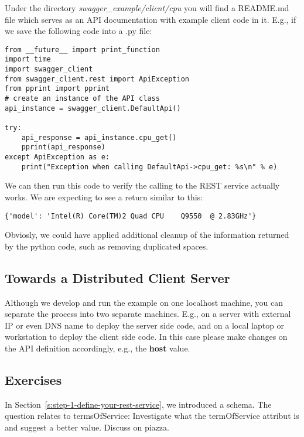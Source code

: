 Under the directory \emph{swagger\_example/client/cpu} you will find a
README.md file which serves as an API documentation with example client
code in it. E.g., if we save the following code into a .py file:

\begin{lstlisting}
from __future__ import print_function
import time
import swagger_client
from swagger_client.rest import ApiException
from pprint import pprint
# create an instance of the API class
api_instance = swagger_client.DefaultApi()

try:
    api_response = api_instance.cpu_get()
    pprint(api_response)
except ApiException as e:
    print("Exception when calling DefaultApi->cpu_get: %s\n" % e)
\end{lstlisting}

We can then run this code to verify the calling to the REST service
actually works. We are expecting to see a return similar to this:

\begin{lstlisting}
{'model': 'Intel(R) Core(TM)2 Quad CPU    Q9550  @ 2.83GHz'}
\end{lstlisting}

Obviosly, we could have applied additional cleanup of the information
returned by the python code, such as removing duplicated spaces.

\subsection{Towards a Distributed Client
Server}\label{towards-a-distributed-client-server}

Although we develop and run the example on one localhost machine, you
can separate the process into two separate machines. E.g., on a server
with external IP or even DNS name to deploy the server side code, and on
a local laptop or workstation to deploy the client side code. In this
case please make changes on the API definition accordingly, e.g., the
\textbf{host} value.

\subsection{Exercises}\label{s:swagger-exercises}

\begin{exercise}
  In Section~\ref{s:step-1-define-your-rest-service}, we introduced a
  schema. The question relates to termsOfService: Investigate what the
  termOfService attribut is and suggest a better value. Discuss on
  piazza.
\end{exercise}

